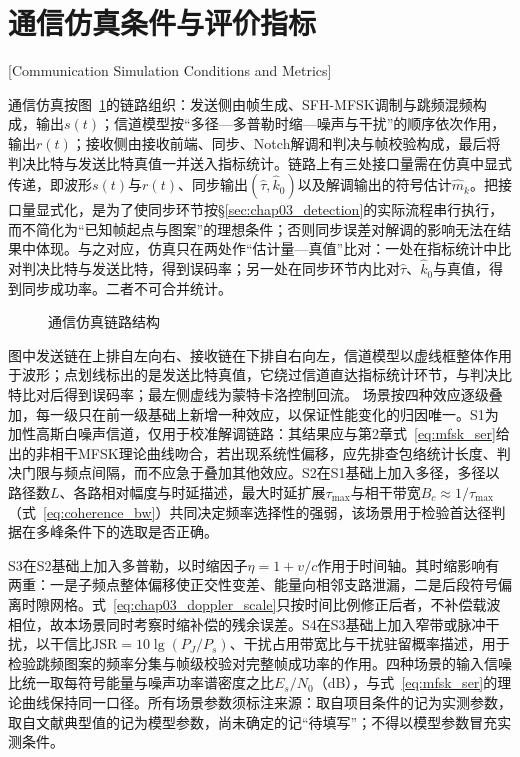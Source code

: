 \section{通信仿真条件与评价指标}[Communication Simulation Conditions and Metrics]
\label{sec:chap03_metrics}

通信仿真按图~\ref{fig:chap03_sim_chain}的链路组织：发送侧由帧生成、SFH-MFSK调制与跳频混频构成，输出$s(t)$；信道模型按“多径—多普勒时缩—噪声与干扰”的顺序依次作用，输出$r(t)$；接收侧由接收前端、同步、Notch解调和判决与帧校验构成，最后将判决比特与发送比特真值一并送入指标统计。链路上有三处接口量需在仿真中显式传递，即波形$s(t)$与$r(t)$、同步输出$(\hat\tau,\hat k_0)$以及解调输出的符号估计$\hat m_k$。把接口量显式化，是为了使同步环节按\S\ref{sec:chap03_detection}的实际流程串行执行，而不简化为“已知帧起点与图案”的理想条件；否则同步误差对解调的影响无法在结果中体现。与之对应，仿真只在两处作“估计量—真值”比对：一处在指标统计中比对判决比特与发送比特，得到误码率；另一处在同步环节内比对$\hat\tau$、$\hat k_0$与真值，得到同步成功率。二者不可合并统计。

\begin{figure}[htbp]
 \centering
 \begin{tikzpicture}[x=1cm,y=1cm]
  
 \end{tikzpicture}
 \caption[通信仿真链路结构]{通信仿真链路结构}
 \label{fig:chap03_sim_chain}
\end{figure}

图中发送链在上排自左向右、接收链在下排自右向左，信道模型以虚线框整体作用于波形；点划线标出的是发送比特真值，它绕过信道直达指标统计环节，与判决比特比对后得到误码率；最左侧虚线为蒙特卡洛控制回流。
场景按四种效应逐级叠加，每一级只在前一级基础上新增一种效应，以保证性能变化的归因唯一。S1为加性高斯白噪声信道，仅用于校准解调链路：其结果应与第2章式~\eqref{eq:mfsk_ser}给出的非相干MFSK理论曲线吻合，若出现系统性偏移，应先排查包络统计长度、判决门限与频点间隔，而不应急于叠加其他效应。S2在S1基础上加入多径，多径以路径数$L$、各路相对幅度与时延描述，最大时延扩展$\tau_{\max}$与相干带宽$B_c\approx1/\tau_{\max}$（式~\eqref{eq:coherence_bw}）共同决定频率选择性的强弱，该场景用于检验首达径判据在多峰条件下的选取是否正确。

S3在S2基础上加入多普勒，以时缩因子$\eta=1+v/c$作用于时间轴。其时缩影响有两重：一是子频点整体偏移使正交性变差、能量向相邻支路泄漏，二是后段符号偏离时隙网格。式~\eqref{eq:chap03_doppler_scale}只按时间比例修正后者，不补偿载波相位，故本场景同时考察时缩补偿的残余误差。S4在S3基础上加入窄带或脉冲干扰，以干信比$\mathrm{JSR}=10\lg(P_J/P_s)$、干扰占用带宽比与干扰驻留概率描述，用于检验跳频图案的频率分集与帧级校验对完整帧成功率的作用。四种场景的输入信噪比统一取每符号能量与噪声功率谱密度之比$E_s/N_0$（dB），与式~\eqref{eq:mfsk_ser}的理论曲线保持同一口径。所有场景参数须标注来源：取自项目条件的记为实测参数，取自文献典型值的记为模型参数，尚未确定的记“待填写”；不得以模型参数冒充实测条件。


